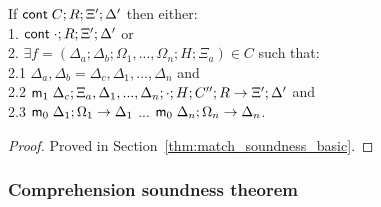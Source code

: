 If $\mathsf{cont} \; C; R; \Xi'; \Delta'$ then either:\\
1. \hspace{1cm} $\mathsf{cont} \; \cdot; R; \Xi'; \Delta'$ or \\
2. \hspace{1cm} $\exists f = (\Delta_a; \Delta_b; \Omega_1, ..., \Omega_n; H; \Xi_a) \in C$ such that:\\
2.1 \hspace{2cm} $\Delta_a, \Delta_b = \Delta_c, \Delta_1, ..., \Delta_n$ and \\
2.2 \hspace{2cm} $\mathsf{m}_1 \; \Delta_c; \Xi_a, \Delta_1, ..., \Delta_n; \cdot; H; C''; R \rightarrow \Xi'; \Delta'$ and \\
2.3 \hspace{2cm} $\mathsf{m}_0 \; \Delta_1; \Omega_1 \rightarrow \Delta_1$ ... $\mathsf{m}_0 \; \Delta_n; \Omega_n \rightarrow \Delta_n$.\\

\begin{proof}
Proved in Section~\ref{thm:match_soundness_basic}.
\end{proof}

\subsubsection{Comprehension soundness theorem}

